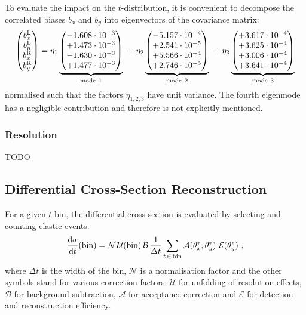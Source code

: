 To evaluate the impact on the $t$-distribution, it is convenient to decompose the correlated biases $b_x$ and $b_y$ into eigenvectors of the covariance matrix:
\begin{equation}
\label{eq:opt bias modes}
\begin{pmatrix} b_x^{\rm L}\cr b_y^{\rm L} \cr b_x^{\rm R}\cr b_y^{\rm R} \end{pmatrix} =
	   \eta_1 \underbrace{\begin{pmatrix} -1.608\cdot10^{-3}\cr +1.473\cdot10^{-3}\cr -1.630\cdot10^{-3}\cr +1.477\cdot10^{-3} \end{pmatrix}}_{\rm mode\ 1}
  \ +\ \eta_2 \underbrace{\begin{pmatrix} -5.157\cdot10^{-4}\cr +2.541\cdot10^{-5}\cr +5.566\cdot10^{-4}\cr +2.746\cdot10^{-5} \end{pmatrix}}_{\rm mode\ 2}
  \ +\ \eta_3 \underbrace{\begin{pmatrix} +3.617\cdot10^{-4}\cr +3.625\cdot10^{-4}\cr +3.006\cdot10^{-4}\cr +3.641\cdot10^{-4} \end{pmatrix}}_{\rm mode\ 3}
\end{equation}
normalised such that the factors $\eta_{1,2,3}$ have unit variance. The fourth eigenmode has a negligible contribution and therefore is not explicitly mentioned.




\subsubsection{Resolution}
\label{sec:resolution}

TODO



\subsection{Differential Cross-Section Reconstruction}
\label{sec:diff cs}

For a given $t$ bin, the differential cross-section is evaluated by selecting and counting elastic events:
\begin{equation}
{{\rm d}\sigma\over {\rm d}t}(\hbox{bin}) =
	\mathcal{N}\, \mathcal{U}({\rm bin})\, \mathcal{B}\, {1\over \Delta t}
	\sum\limits_{t\, \in\, {\rm bin}} \mathcal{A}(\theta^*_x, \theta_y^*)\ \mathcal{E}(\theta_y^*)
	\ ,
\end{equation}
where $\Delta t$ is the width of the bin, $\mathcal{N}$ is a normalisation factor and the other symbols stand for various correction factors: $\mathcal{U}$ for unfolding of resolution effects, $\mathcal{B}$ for background subtraction, $\mathcal{A}$ for acceptance correction and $\mathcal{E}$ for detection and reconstruction efficiency.



